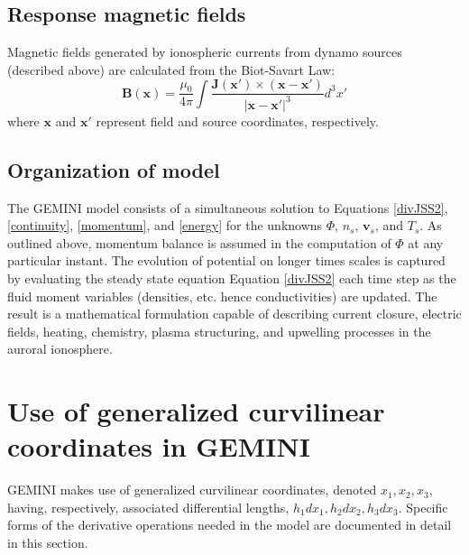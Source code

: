 \documentclass[11pt,letterpaper]{article}
\begin{document}
\subsection{Response magnetic fields}

Magnetic fields generated by ionospheric currents from dynamo sources (described above) are calculated from the Biot-Savart Law:
\begin{equation}
  \mathbf{B}(\mathbf{x}) = \frac{\mu_0}{4 \pi} \int \frac{\mathbf{J}(\mathbf{x}') \times (\mathbf{x} - \mathbf{x}')}{|\mathbf{x} - \mathbf{x}'|^3} d^3 x'
\end{equation}
where $\mathbf{x}$ and $\mathbf{x'}$ represent field and source coordinates, respectively.  



\subsection{Organization of model}

The GEMINI model consists of a simultaneous solution to Equations \ref{divJSS2}, \ref{continuity}, \ref{momentum}, and \ref{energy} for the unknowns $\Phi$, $n_s$, $\mathbf{v}_s$, and $T_s$.  As outlined above, momentum balance is assumed in the computation of $\Phi$ at any particular instant.  The evolution of potential on longer times scales is captured by evaluating the steady state equation Equation \ref{divJSS2} each time step as the fluid moment variables (densities, etc. hence conductivities) are updated.  The result is a mathematical formulation capable of describing current closure, electric fields, heating, chemistry, plasma structuring, and upwelling processes in the auroral ionosphere.  



\section{Use of generalized curvilinear coordinates in GEMINI}

GEMINI makes use of generalized curvilinear coordinates, denoted $x_1,x_2,x_3$, having, respectively, associated differential lengths, $h_1 dx_1,h_2 dx_2,h_3 dx_3$.  Specific forms of the derivative operations needed in the model are documented in detail in this section.  

\end{document}
